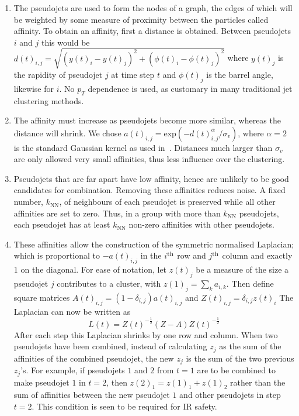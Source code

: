     \begin{enumerate}
        \item \label{step:start} The pseudojets are used to form the nodes of a graph,
        the edges of which will be weighted by some measure of proximity between the particles called affinity.
        To obtain an affinity, first a distance is obtained.
        Between pseudojets \(i\) and \(j\) this would be \(d(t)_{i,j} = \sqrt{(y(t)_i - y(t)_j)^2 + (\phi(t)_i - \phi(t)_j)^2}\)
        where \(y(t)_j\) is the rapidity of pseudojet \(j\) at time step \(t\) and \(\phi(t)_j\) is the barrel angle, likewise for \(i\).
        No \(p_T\) dependence is used, as customary in many traditional jet clustering methods.

    \item \label{step:affinity} The affinity must increase as pseudojets become more similar,
        whereas the distance will shrink.
        We chose \(a(t)_{i,j} = \text{exp}(-d(t)_{i,j}^\alpha/\sigma_v)\),
        where $\alpha=2$ is the standard Gaussian kernel as
        used in~\cite{Belkin:2003_unfound4}.
            Distances much larger than \(\sigma_v\) are only allowed very small affinities,
            thus less influence over the clustering.

    \item\label{step:KNN} Pseudojets that are far apart have low affinity,
        hence are unlikely to be good candidates for combination.
        Removing these affinities reduces noise.
    A fixed number, \(k_\text{NN}\), of neighbours of each pseudojet is 
    preserved while all other affinities are set to zero.
    Thus, in a group with more than \(k_\text{NN}\) pseudojets,
    each pseudojet has at least \(k_\text{NN}\) non-zero affinities with other pseudojets.

\item\label{step:laplacean} These affinities allow the construction of the symmetric normalised
        Laplacian; which is proportional to \(-a(t)_{i, j}\)
        in the \(i\)$^{\rm th}$ row and \(j\)$^{\rm th}$ column and exactly \(1\) on the diagonal.
        For ease of notation, let \(z(t)_j\) be a measure of the size a pseudojet \(j\) contributes to a cluster,
        with \(z(1)_j = \sum_k a_{i,k}\).
        Then define square matrices \(A(t)_{i, j} = (1 - \delta_{i, j}) a(t)_{i, j}\) and \(Z(t)_{i, j} = \delta_{i, j} z(t)_i\)
        The Laplacian can now be written as
       \begin{equation}\label{eqn:Laplacian}
        L(t) = Z(t)^{-\frac{1}{2}}(Z - A)Z(t)^{-\frac{1}{2}}
       \end{equation}
        After each step this Laplacian shrinks by one row and column.
        When two pseudojets have been combined, instead of calculating \(z_j\) as the sum of the affinities of the combined pseudojet,
        the new \(z_j\) is the sum of the two previous \(z_j\)'s.
        For example, if pseudojets \(1\) and \(2\) from \(t=1\) are to be combined to make pseudojet \(1\) in \(t=2\),
        then \(z(2)_{1} = z(1)_1 + z(1)_2\) rather than the sum of affinities between the new pseudojet \(1\) and other pseudojets in step \(t=2\).
        This condition is seen to be required for IR safety. 


\end{enumerate}
